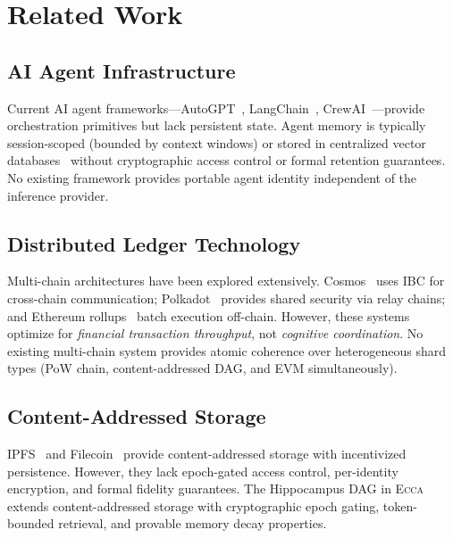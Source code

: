 \documentclass[11pt,twocolumn]{article}
\theoremstyle{definition}
\theoremstyle{plain}
\theoremstyle{remark}
\newcommand{\ecca}{\textsc{Ecca}}
\begin{document}
\section{Related Work}\label{sec:related}

\subsection{AI Agent Infrastructure}

Current AI agent frameworks---AutoGPT~\cite{autogpt2023}, LangChain~\cite{langchain2023}, CrewAI~\cite{crewai2024}---provide orchestration primitives but lack persistent state. Agent memory is typically session-scoped (bounded by context windows) or stored in centralized vector databases~\cite{chroma2023,pinecone2023} without cryptographic access control or formal retention guarantees. No existing framework provides portable agent identity independent of the inference provider.

\subsection{Distributed Ledger Technology}

Multi-chain architectures have been explored extensively. Cosmos~\cite{kwon2019cosmos} uses IBC for cross-chain communication; Polkadot~\cite{wood2016polkadot} provides shared security via relay chains; and Ethereum rollups~\cite{thibault2022rollups} batch execution off-chain. However, these systems optimize for \emph{financial transaction throughput}, not \emph{cognitive coordination}. No existing multi-chain system provides atomic coherence over heterogeneous shard types (PoW chain, content-addressed DAG, and EVM simultaneously).

\subsection{Content-Addressed Storage}

IPFS~\cite{benet2014ipfs} and Filecoin~\cite{protocol2017filecoin} provide content-addressed storage with incentivized persistence. However, they lack epoch-gated access control, per-identity encryption, and formal fidelity guarantees. The Hippocampus DAG in \ecca{} extends content-addressed storage with cryptographic epoch gating, token-bounded retrieval, and provable memory decay properties.
\end{document}
